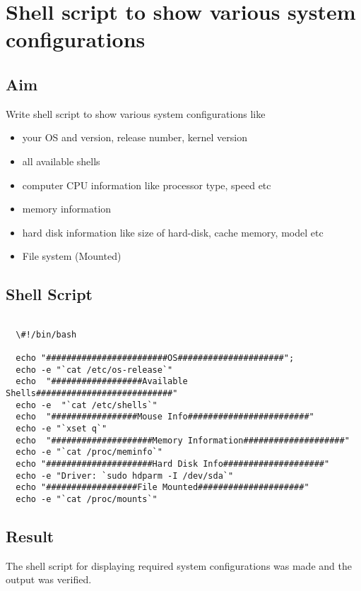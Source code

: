 \documentclass{article}
\begin{document}
\newpage

\section{Shell script to show various system configurations}

\subsection {Aim}

Write shell script to show various system configurations like
\begin{itemize}
\item your OS and version, release number, kernel version
\item all available shells
\item computer CPU information like processor type, speed etc
\item memory information
\item hard disk information like size of hard-disk, cache memory, model etc
\item File system (Mounted)
\end{itemize}

\subsection{Shell Script}

\begin{verbatim}

  \#!/bin/bash
   
  echo "########################OS#####################";
  echo -e "`cat /etc/os-release`"
  echo  "##################Available Shells###########################"
  echo -e  "`cat /etc/shells`"
  echo  "#################Mouse Info########################"
  echo -e "`xset q`"
  echo  "####################Memory Information####################"
  echo -e "`cat /proc/meminfo`"
  echo "#####################Hard Disk Info####################"
  echo -e "Driver: `sudo hdparm -I /dev/sda`"
  echo "##################File Mounted#####################"
  echo -e "`cat /proc/mounts`"

\end{verbatim}

\subsection{Result}
The shell script for displaying required system configurations was made and the output was verified.
\end{document}
